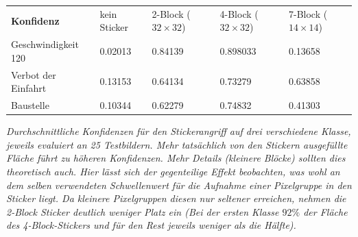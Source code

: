 \documentclass[11pt]{article} %
\begin{document}
 \begin{threeparttable}
\begin{small}
\begin{tabular}{lllll}

\textbf{Konfidenz} & kein Sticker & 2-Block ($32\times 32$) & 4-Block ($32 \times 32$) & 7-Block ($14 \times 14$) \\
Geschwindigkeit 120               &  0.02013     &          0.84139                       &      0.898033                            &  0.13658  \\
Verbot der Einfahrt                &         0.13153                         &                0.64134                 &       0.73279                           &    0.63858      \\
Baustelle                   &                  0.10344                         &       0.62279                          &               0.74832                   &  0.41303
\end{tabular}
\end{small}
 \begin{tablenotes}
      \footnotesize
      \item\textit{Durchschnittliche Konfidenzen für den Stickerangriff auf drei verschiedene Klasse, jeweils evaluiert an 25 Testbildern. Mehr tatsächlich von den Stickern ausgefüllte Fläche führt zu höheren Konfidenzen. Mehr Details (kleinere Blöcke) sollten dies theoretisch auch. Hier lässt sich der gegenteilige Effekt beobachten, was wohl an dem selben verwendeten Schwellenwert für die Aufnahme einer Pixelgruppe in den Sticker liegt. Da kleinere Pixelgruppen diesen nur seltener erreichen, nehmen die 2-Block Sticker deutlich weniger Platz ein (Bei der ersten Klasse $92\%$ der Fläche des 4-Block-Stickers und für den Rest jeweils weniger als die Hälfte).}
    \end{tablenotes}
  \end{threeparttable}
\end{document}
